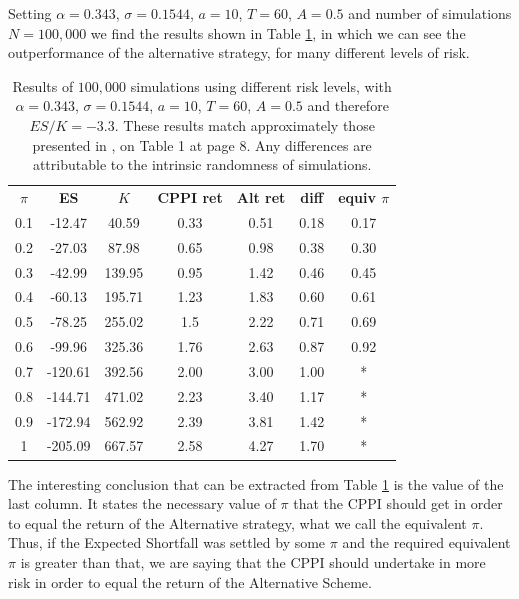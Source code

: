 Setting $\alpha = 0.343$, $\sigma = 0.1544$, $a = 10$, $T = 60$, $A = 0.5$ and number of simulations $N = 100,000$ we find the results shown in Table \ref{tab:cppi_alt}, in which we can see the outperformance of the alternative strategy, for many different levels of risk.

\begin{table}[h]
\centering
\caption{Results of $100,000$ simulations using different risk levels, with $\alpha = 0.343$, $\sigma = 0.1544$, $a = 10$, $T = 60$, $A = 0.5$ and therefore $ES/K = -3.3$. These results match approximately those presented in \cite{a:guillen-optimisation}, on Table 1 at page 8. Any differences are attributable to the intrinsic randomness of simulations.}
\label{tab:cppi_alt}
\begin{tabular}{ccccccc}
\textbf{$\pi$} & \textbf{ES } & \textbf{$K$} & \textbf{CPPI ret} & \textbf{Alt ret} & \textbf{diff}  & \textbf{equiv $\pi$}\\
0.1   & -12.47  & 40.59  & 0.33     & 0.51    & 0.18    & 0.17\\
0.2   & -27.03  & 87.98  & 0.65     & 0.98    & 0.38    & 0.30 \\
0.3   & -42.99  & 139.95 & 0.95     & 1.42    & 0.46    & 0.45 \\
0.4   & -60.13  & 195.71 & 1.23     & 1.83    & 0.60    & 0.61 \\
0.5   & -78.25  & 255.02 & 1.5      & 2.22    & 0.71    & 0.69 \\
0.6   & -99.96  & 325.36 & 1.76     & 2.63    & 0.87    & 0.92 \\
0.7   & -120.61 & 392.56 & 2.00     & 3.00    & 1.00    & * \\
0.8   & -144.71 & 471.02 & 2.23     & 3.40    & 1.17    & * \\
0.9   & -172.94 & 562.92 & 2.39     & 3.81    & 1.42    & * \\
1     & -205.09 & 667.57 & 2.58     & 4.27    & 1.70    & *
\end{tabular}
\end{table}

The interesting conclusion that can be extracted from Table \ref{tab:cppi_alt} is the value of the last column. It states the necessary value of $\pi$ that the CPPI should get in order to equal the return of the Alternative strategy, what we call the equivalent $\pi$. Thus, if the Expected Shortfall was settled by some $\pi$ and the required equivalent $\pi$ is greater than that, we are saying that the CPPI should undertake in more risk in order to equal the return of the Alternative Scheme.

